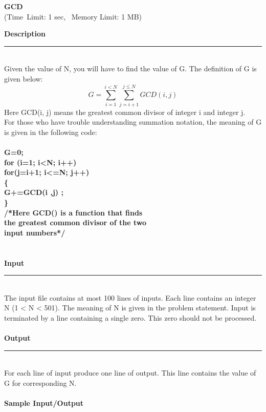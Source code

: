 \documentclass{article}
\begin{document}
    \begin{center} 
        {\LARGE \textbf{GCD}}
        \\ {\large (Time\  Limit: 1 sec, \ Memory Limit: 1 MB)}
    \end{center}
    {\Large \textbf {Description}}
    \\\rule[5pt]{18cm}{0.01em}
    \fontsize{12pt}{11pt} \selectfont
    \\Given the value of N, you will have to find the value of G. The definition of G is given below:
    \\  \[ G=\sum \limits_{i=1}^{i<N} \sum \limits_{j=i+1}^{j\leq N} GCD(i,j) \]
    Here GCD(i, j) means the greatest common divisor of integer i and integer j.
    \\  For those who have trouble understanding summation notation, the meaning of G is given in the
    following code:
    \\\\ {\Large \textbf{G=0;
    \\for (i=1; i<N; i++)
    \\for(j=i+1; i<=N; j++) \\ \{  \\ G+=GCD(i ,j) ; \\ \}
   \\  /*Here GCD() is a function that finds \\ the greatest common divisor of the two \\ input numbers*/ }}\\
   \\\\ {\Large \textbf{Input}} %
    \\ \rule[5pt]{18cm}{0.02em} 
    \\The input file contains at most 100 lines of inputs. Each line contains an integer  N (1 < N < 501).
    The meaning of N is given in the problem statement. Input is terminated by a line containing a single
    zero. This zero should not be processed. 
    \\\\{ \Large \textbf{Output}} %
    \\\rule[5pt]{18cm}{0.01em} 
    \\For each line of input produce one line of output. This line contains the value of G for corresponding
    N. 
    \\\\{\Large \textbf{Sample  Input/Output}}
\end{document}
